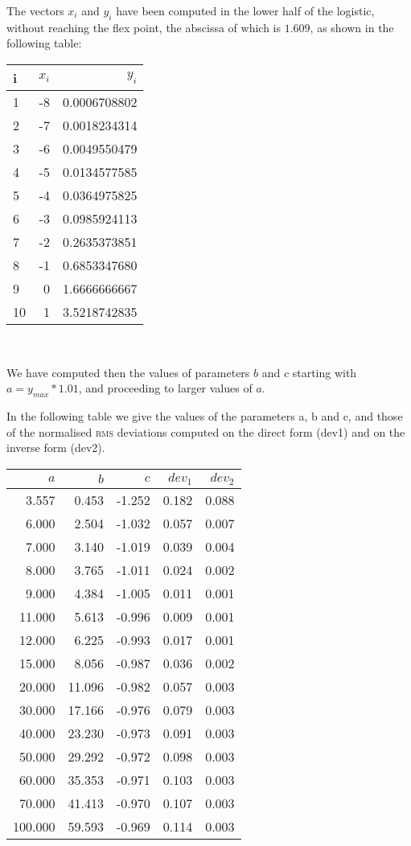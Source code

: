 \documentclass[%
 aip,
 jmp,%
 amsmath,amssymb,
 reprint,%
]{revtex4-1}
\begin{document}
The vectors $x_i$ and $y_i$ have been computed in the lower half of the logistic, without reaching the flex point, the abscissa of which is $1.609$, as shown in the following table:\\

{\centering
\begin{tabular}{l@{\hskip 5mm}r@{\hskip 6mm}r}

 i & $x_i$ & $y_i$ \\ \hline
 1 & -8 & 0.0006708802 \\
 2 & -7 & 0.0018234314 \\
 3 & -6 & 0.0049550479 \\
 4 & -5	& 0.0134577585 \\
 5 & -4 & 0.0364975825 \\
 6 & -3 & 0.0985924113 \\
 7 & -2 & 0.2635373851 \\
 8 & -1 & 0.6853347680 \\
 9 &  0 & 1.6666666667 \\
 10 & 1 & 3.5218742835
\end{tabular}\\[4mm]}

We have computed then the values of parameters $b$ and $c$ starting with $a = y_{max} * 1.01$, and proceeding to larger values of $a$.

In the following table we give the values of the parameters  a, b and c, and those of the normalised \textsc{rms} deviations computed on the direct  form (dev1) and on the inverse form (dev2).

{\centering
\begin{tabular}{r@{\hskip 5mm}r@{\hskip 5mm}r@{\hskip 5mm}r@{\hskip 5mm}r}
 $a$ & $b$ & $c$ & $dev_1$ & $dev_2$  \\ \hline
 	3.557 & 0.453 & -1.252 & 0.182 & 0.088 \\   
	6.000 & 2.504 & -1.032 & 0.057 & 0.007 \\     
	7.000 & 3.140 & -1.019 & 0.039 & 0.004 \\      
	8.000 & 3.765 & -1.011 & 0.024 & 0.002 \\      
	9.000 & 4.384 & -1.005 & 0.011 & 0.001 \\      
	11.000 & 5.613 & -0.996 & 0.009 & 0.001 \\      
	12.000 & 6.225 & -0.993 & 0.017 & 0.001 \\      
	15.000 & 8.056 & -0.987 & 0.036	& 0.002 \\      
	20.000 & 11.096 & -0.982 & 0.057 & 0.003 \\      
	30.000 & 17.166 & -0.976 & 0.079 & 0.003 \\      
	40.000 & 23.230 & -0.973 & 0.091 & 0.003 \\      
	50.000 & 29.292	& -0.972 & 0.098 & 0.003 \\      
	60.000 & 35.353 & -0.971 & 0.103 & 0.003 \\      
	70.000 & 41.413 & -0.970 & 0.107 & 0.003 \\      
	100.000	& 59.593 & -0.969 & 0.114 &	0.003    
\end{tabular}\\[4mm]}
\end{document}
